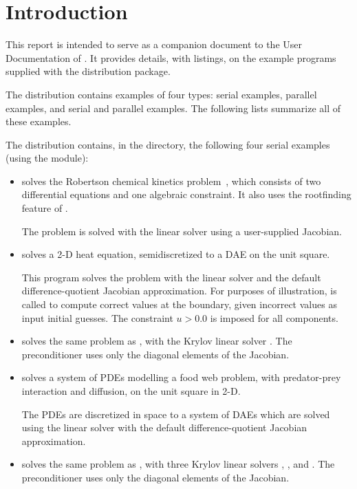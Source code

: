 \section{Introduction}\label{s:ex_intro}

This report is intended to serve as a companion document to the User
Documentation of {\ida} \cite{ida2.2.0_ug}.  It provides details, with
listings, on the example programs supplied with the {\ida} distribution
package.

The {\ida} distribution contains examples of four types: serial
{\C} examples, parallel {\C} examples, and serial and parallel {\F}
examples.  The following lists summarize all of these examples.

The {\ida} distribution contains, in the 
directory, the following four serial examples (using the {\nvecs} module):
\begin{itemize}

\item {}
  solves the Robertson chemical kinetics problem~\cite{Rob:66}, which consists
  of two differential equations and one algebraic constraint.  It also uses
  the rootfinding feature of {\ida}.

  The problem is solved with the {\idadense} linear solver using
  a user-supplied Jacobian.

\item {}
  solves a 2-D heat equation, semidiscretized to a DAE on the unit square.

  This program solves the problem with the {\idaband} linear solver and
  the default difference-quotient Jacobian approximation. For purposes of
  illustration,  is called to compute correct values at the
  boundary, given incorrect values as input initial guesses. The constraint
  $u > 0.0$ is imposed for all components.

\item {}
  solves the same problem as , with the Krylov linear solver
  {\idaspgmr}. The preconditioner uses only the diagonal elements of the 
  Jacobian.

\item {}
  solves a system of PDEs modelling a food web problem, with predator-prey
  interaction and diffusion, on the unit square in 2-D.

  The PDEs are discretized in space to a system of DAEs which are solved
  using the {\idaband} linear solver with the default difference-quotient 
  Jacobian approximation.

\item {}
  solves the same problem as , with three Krylov linear solvers
  {\idaspgmr}, {\idaspbcg}, and {\idasptfqmr}.  The preconditioner uses only
  the diagonal elements of the Jacobian.

\end{itemize}


